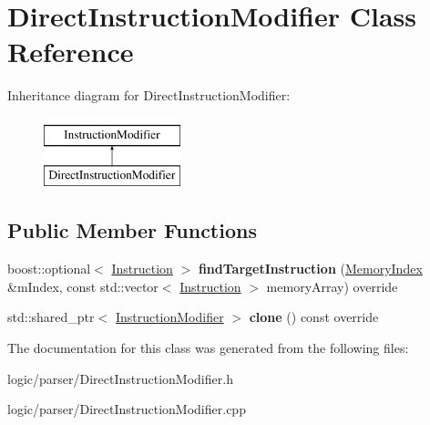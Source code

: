 \hypertarget{classDirectInstructionModifier}{}\section{Direct\+Instruction\+Modifier Class Reference}
\label{classDirectInstructionModifier}
Inheritance diagram for Direct\+Instruction\+Modifier\+:\begin{figure}[H]
\begin{center}
\leavevmode
\includegraphics[height=2.000000cm]{classDirectInstructionModifier}
\end{center}
\end{figure}
\subsection*{Public Member Functions}
\begin{DoxyCompactItemize}
\item 
\mbox{\label{classDirectInstructionModifier_a1b6c16747753e64bfaa0e1da3a4e96ad}} 
boost\+::optional$<$ \hyperlink{classInstruction}{Instruction} $>$ {\bfseries find\+Target\+Instruction} (\hyperlink{classMemoryIndex}{Memory\+Index} \&m\+Index, const std\+::vector$<$ \hyperlink{classInstruction}{Instruction} $>$ memory\+Array) override
\item 
\mbox{\label{classDirectInstructionModifier_a13e4d21fcbb0e17f440dd14047599ebb}} 
std\+::shared\+\_\+ptr$<$ \hyperlink{classInstructionModifier}{Instruction\+Modifier} $>$ {\bfseries clone} () const override
\end{DoxyCompactItemize}


The documentation for this class was generated from the following files\+:\begin{DoxyCompactItemize}
\item 
logic/parser/Direct\+Instruction\+Modifier.\+h\item 
logic/parser/Direct\+Instruction\+Modifier.\+cpp\end{DoxyCompactItemize}
